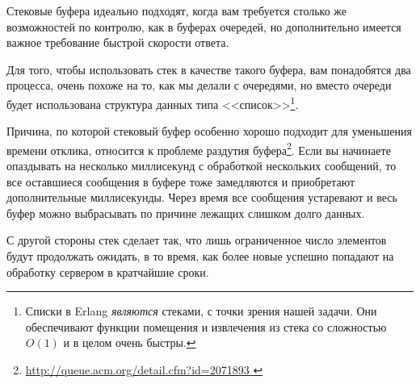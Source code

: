 Стековые буфера идеально подходят, когда вам требуется столько же возможностей по контролю, как в буферах очередей, но дополнительно имеется важное требование быстрой скорости ответа.

Для того, чтобы использовать стек в качестве такого буфера, вам понадобятся два процесса, очень похоже на то, как мы делали с очередями, но вместо очереди будет использована структура данных типа <<список>>\footnote{Списки в Erlang \emph{являются} стеками, с точки зрения нашей задачи. Они обеспечивают функции помещения и извлечения из стека со сложностью $O(1)$ и в целом очень быстры.}.

Причина, по которой стековый буфер особенно хорошо подходит для уменьшения времени отклика, относится к проблеме раздутия буфера\footnote{\href{http://queue.acm.org/detail.cfm?id=2071893}{http://queue.acm.org/detail.cfm?id=2071893 }}. Если вы начинаете опаздывать на несколько миллисекунд с обработкой нескольких сообщений, то все оставшиеся сообщения в буфере тоже замедляются и приобретают дополнительные миллисекунды. Через время все сообщения устаревают и весь буфер можно выбрасывать по причине лежащих слишком долго данных.


С другой стороны стек сделает так, что лишь ограниченное число элементов будут продолжать ожидать, в то время, как более новые успешно попадают на обработку сервером в кратчайшие сроки.

